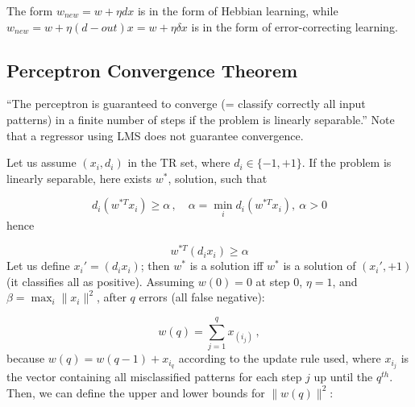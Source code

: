 The form $w_{new} = w + \eta d x$ is in the form of Hebbian learning, while $w_{new} = w + \eta (d-out) x = w + \eta \delta x$ is in the form of error-correcting learning.

\subsection{Perceptron Convergence Theorem}

``The perceptron is guaranteed to converge (= classify correctly all input patterns) in a finite number of steps if the problem is linearly separable.'' Note that a regressor using LMS does not guarantee convergence.

Let us assume $(x_i, d_i)$ in the TR set, where $d_i \in \{-1,+1\}$. If the problem is linearly separable, here exists $w^*$, solution, such that

\begin{equation*}
    d_i(w^{*T}x_i) \geq \alpha \, , \quad \alpha=\min_i d_i(w^{*T}x_i), \ \alpha > 0
\end{equation*}
hence

\begin{equation*}
    w^{*T}(d_ix_i) \geq \alpha
\end{equation*}
Let us define $x_i' = (d_ix_i)$; then $w^*$ is a solution iff $w^*$ is a solution of $(x_i', +1)$ (it classifies all as positive).  Assuming $w(0) = 0$ at step 0, $\eta = 1$, and $\beta = \max_i\|x_i\|^2$, after $q$ errors (all false negative):

\begin{equation*}
    w(q) = \sum_{j=1}^q x_{(i_j)} \, ,
\end{equation*}
because $w(q) = w(q-1) + x_{i_q}$ according to the update rule used, where $x_{i_j}$ is the vector containing all misclassified patterns for each step $j$ up until the $q^{th}$. Then, we can define the upper and lower bounds for $\|w(q)\|^2$:

